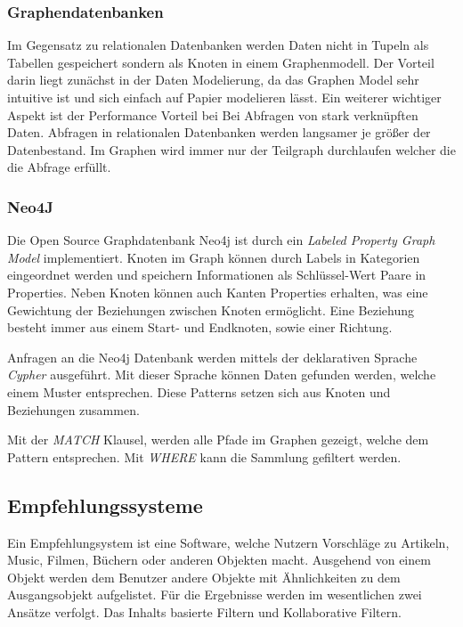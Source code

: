 	
	
	\subsubsection{Graphendatenbanken}	
	Im Gegensatz zu relationalen Datenbanken werden Daten nicht in Tupeln als Tabellen gespeichert sondern als Knoten in einem Graphenmodell. Der Vorteil darin liegt zunächst in der Daten Modelierung, da das Graphen Model sehr intuitive ist und sich einfach auf Papier modelieren lässt. 
	Ein weiterer wichtiger Aspekt ist der Performance Vorteil bei Bei Abfragen von stark verknüpften Daten. Abfragen in relationalen Datenbanken werden langsamer je größer der Datenbestand. Im Graphen wird immer nur der Teilgraph durchlaufen welcher die die Abfrage erfüllt.\cite[8]{robinson_webber_eifrem_2015}
	
	\subsubsection{Neo4J}
	
	Die Open Source Graphdatenbank Neo4j ist durch ein \textit{Labeled Property Graph Model} implementiert. Knoten im Graph können durch Labels in Kategorien eingeordnet werden und speichern Informationen als Schlüssel-Wert Paare in Properties. 
	Neben Knoten können auch Kanten Properties erhalten, was eine Gewichtung der Beziehungen zwischen Knoten ermöglicht. Eine Beziehung besteht immer aus einem Start- und Endknoten, sowie einer Richtung.\cite[26]{Robinson2015}
	
	Anfragen an die Neo4j Datenbank werden mittels der deklarativen Sprache \textit{Cypher} ausgeführt. Mit dieser Sprache können Daten gefunden werden, welche einem Muster  entsprechen. Diese Patterns setzen sich aus Knoten und Beziehungen zusammen. 
	
% 

Mit der \textit{MATCH} Klausel, werden alle Pfade im Graphen gezeigt, welche dem Pattern entsprechen. Mit \textit{WHERE} kann die Sammlung gefiltert werden.

\subsection{Empfehlungssysteme}

Ein Empfehlungsystem ist eine Software, welche Nutzern Vorschläge zu Artikeln, Music, Filmen, Büchern oder anderen Objekten macht. \cite{Ricci2010} Ausgehend von einem Objekt werden dem Benutzer andere Objekte mit Ähnlichkeiten zu dem Ausgangsobjekt aufgelistet. Für die Ergebnisse werden im wesentlichen zwei Ansätze verfolgt. Das Inhalts basierte Filtern und Kollaborative Filtern.


	